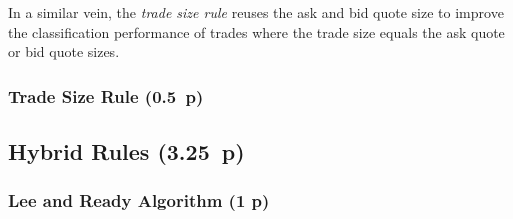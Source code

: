 In a similar vein, the \textit{trade size rule} reuses the ask and bid quote size to improve the classification performance of trades where the trade size equals the ask quote or bid quote sizes.

\subsubsection{Trade Size Rule (0.5~p)}\label{sec:trade-size-rule}

\begin{algorithm}

  \caption{$\operatorname{\mathtt{tradesize}}(t_i, a_i, b_i)$ \label{sec:alg:tradesize-rule}}


  \BlankLine %

\end{algorithm}


\subsection{Hybrid Rules (3.25~p)}\label{sec:hybrid-rules}

\subsubsection{Lee and Ready Algorithm (1 p)}\label{sec:lee-and-ready-algorithm}

